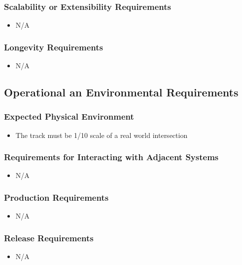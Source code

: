 \documentclass [12pt]{article}
\begin{document}
\subsubsection{Scalability or Extensibility Requirements }
	\begin{itemize}
		\item N/A
	\end{itemize}
		
\subsubsection{Longevity Requirements }
	\begin{itemize}
		\item N/A
	\end{itemize}

\subsection{Operational an Environmental Requirements}
\subsubsection{Expected Physical Environment }
	\begin{itemize}
		\item The track must be 1/10 scale of a real world intersection
	\end{itemize}
		
\subsubsection{Requirements for Interacting with Adjacent Systems}
	\begin{itemize}
		\item N/A
	\end{itemize}

\subsubsection{Production Requirements}
	\begin{itemize}
		\item N/A
	\end{itemize} 

\subsubsection{Release Requirements}
	\begin{itemize}
		\item N/A
	\end{itemize}		
\end{document}
